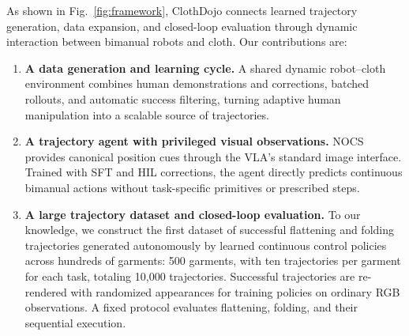 As shown in Fig.~\ref{fig:framework}, ClothDojo connects learned trajectory
generation, data expansion, and closed-loop evaluation through dynamic
interaction between bimanual robots and cloth. Our contributions are:

\begin{enumerate}[\setlength{\labelindent}{0pt}]
  \item \textbf{A data generation and learning cycle.} A shared dynamic
  robot--cloth environment combines human demonstrations and corrections,
  batched rollouts, and automatic success filtering, turning adaptive human
  manipulation into a scalable source of trajectories.
  \item \textbf{A trajectory agent with privileged visual observations.}
  NOCS provides canonical position cues through the VLA's standard image
  interface. Trained with SFT and HIL corrections, the agent directly predicts
  continuous bimanual actions without task-specific primitives or prescribed
  steps.
  \item \textbf{A large trajectory dataset and closed-loop evaluation.}
  To our knowledge, we construct the first dataset of successful flattening
  and folding trajectories generated autonomously by learned continuous
  control policies across hundreds of garments: 500 garments, with ten
  trajectories per garment for each task, totaling 10,000 trajectories.
  Successful trajectories are re-rendered with randomized appearances for
  training policies on ordinary RGB observations. A fixed protocol evaluates
  flattening, folding, and their sequential execution.
\end{enumerate}
